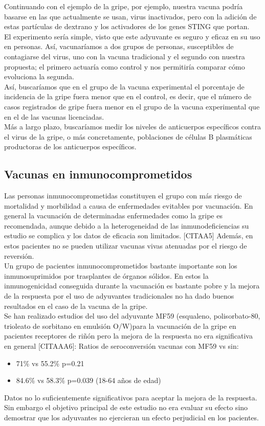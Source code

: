 \documentclass[a4paper,11pt]{article}
\begin{document}
Continuando con el ejemplo de la gripe, por ejemplo, nuestra vacuna podría basarse en las que actualmente se usan, virus inactivados, pero con la adición de estas partículas de dextrano y los activadores de los genes STING que portan. 
\\El experimento sería simple, visto que este adyuvante es seguro y eficaz en su uso en personas. Así, vacunaríamos a dos grupos de personas, susceptibles de contagiarse del virus, uno con la vacuna tradicional y el segundo con nuestra propuesta; el primero actuaría como control y nos permitiría comparar cómo evoluciona la segunda.
\\Así, buscaríamos que en el grupo de la vacuna experimental el porcentaje de incidencia de la gripe fuera menor que en el control, es decir, que el número de casos registrados de gripe fuera menor en el grupo de la vacuna experimental que en el de las vacunas licenciadas.
\\Más a largo plazo, buscaríamos medir los niveles de anticuerpos específicos contra el virus de la gripe, o más concretamente, poblaciones de células B plasmáticas productoras de los anticuerpos específicos.

\subsection{Vacunas en inmunocomprometidos}
Las personas inmunocomprometidas constituyen el grupo con más riesgo de mortalidad y morbilidad a causa de enfermedades evitables por vacunación. En general la vacunación de determinadas enfermedades como la gripe es recomendada, aunque debido a la heterogeneidad de las inmunodeficiencias su estudio se complica y los datos de eficacia son limitados. [CITAA5] Además, en estos pacientes no se pueden utilizar vacunas vivas atenuadas por el riesgo de reversión. 
\\Un grupo de pacientes inmunocomprometidos bastante importante son los inmunosuprimidos por trasplantes de órganos sólidos. En estos la inmunogenicidad conseguida durante la vacunación es bastante pobre y la mejora de la respuesta por el uso de adyuvantes tradicionales no ha dado buenos resultados en el caso de la vacuna de la gripe. 
\\Se han realizado estudios del uso del adyuvante MF59 (esqualeno, polisorbato-80, trioleato de sorbitano en emulsión O/W)para la vacunación de la gripe en pacientes receptores de riñón pero la mejora de la respuesta no era significativa en general [CITAAA6]:
Ratios de seroconversión vacunas con MF59 vs sin:
\begin{itemize}
	\item 71\% vs 55.2\% p=0.21
	\item 84.6\% vs 58.3\% p=0.039 (18-64 años de edad)
\end{itemize}
Datos no lo suficientemente significativos para aceptar la mejora de la respuesta. Sin embargo el objetivo principal de este estudio no era evaluar su efecto sino demostrar que los adyuvantes no ejercieran un efecto perjudicial en los pacientes.
\end{document}
